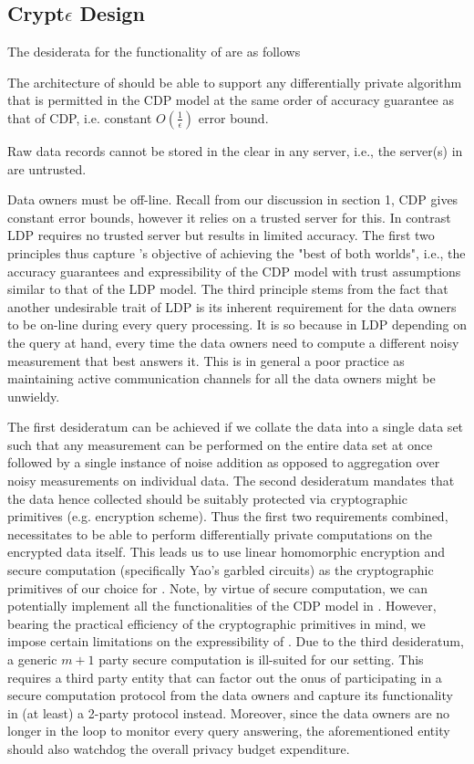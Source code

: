 \subsection{Crypt$\epsilon$ Design}
The  desiderata for  the functionality of \system are as follows
\squishlist \item The architecture of \system should be able to support any differentially private algorithm that is permitted in the \textsf{CDP} model at the same order of accuracy guarantee as that of \textsf{CDP}, i.e. constant $O(\frac{1}{\epsilon})$ error bound.
\item Raw data records cannot be stored in the clear in any server, i.e., the server(s) in \system are untrusted. 
\item Data owners must be  off-line.\squishend
Recall from our discussion in section 1, \textsf{CDP} gives constant error bounds, however it relies on a trusted server for this. In contrast \textsf{LDP} requires no trusted server but results in limited accuracy.  The first two principles thus capture \system's objective of achieving the "best of both worlds", i.e., the accuracy guarantees and expressibility of the \textsf{CDP} model with  trust assumptions similar to that of the \textsf{LDP} model. The third principle stems from the fact that another undesirable trait of \textsf{LDP} is its inherent requirement for the data owners to be on-line during every query processing.  It is so because  in \textsf{LDP} %
depending on the query at hand, every time the data owners need to compute a different noisy measurement that best answers it. This is in general a poor practice as maintaining active communication channels for all the data owners might be unwieldy. \par The first desideratum can be achieved if we collate the data into a single data set such that any measurement can be performed on the entire data set at once followed by a single  instance of noise addition as opposed to aggregation over noisy measurements on individual data. The second desideratum mandates that the data hence collected should be suitably protected via cryptographic primitives (e.g. encryption scheme). Thus the first two requirements combined, necessitates \system to be able to perform differentially private computations on the encrypted data itself. This leads us to use linear homomorphic encryption and secure computation (specifically Yao's garbled circuits)  as the cryptographic primitives of our choice for \system. Note, by virtue of secure computation, we can potentially implement all the functionalities of the \textsf{CDP} model in \system. However, bearing the practical efficiency of the cryptographic primitives in mind, we impose certain limitations on the expressibility of \system. Due to the third desideratum, a generic $m+1$ party secure computation is ill-suited for our setting. This requires a third party entity that can factor out the onus of participating in a secure computation protocol from the data owners and capture its functionality in (at least) a 2-party protocol instead.   Moreover, since the data owners are no longer in the loop to monitor every query answering, the aforementioned entity should also watchdog the overall privacy budget expenditure. 
